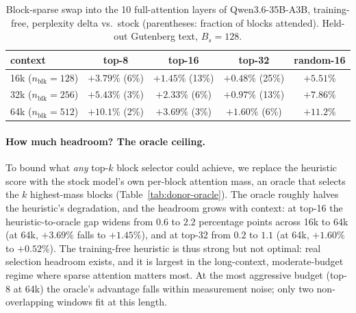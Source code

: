 \documentclass[10pt,letterpaper]{article}
\begin{document}
\begin{table}[h]
\centering
\caption{Block-sparse swap into the 10 full-attention layers of Qwen3.6-35B-A3B,
training-free, perplexity delta vs.\ stock (parentheses: fraction of blocks
attended). Held-out Gutenberg text, $B_s{=}128$.}
\label{tab:donor}
\small
\begin{tabular}{lcccc}
\toprule
context & top-8 & top-16 & top-32 & random-16 \\
\midrule
16k ($n_{\text{blk}}{=}128$) & $+3.79\%$ (6\%) & $+1.45\%$ (13\%) & $+0.48\%$ (25\%) & $+5.51\%$ \\
32k ($n_{\text{blk}}{=}256$) & $+5.43\%$ (3\%) & $+2.33\%$ (6\%) & $+0.97\%$ (13\%) & $+7.86\%$ \\
64k ($n_{\text{blk}}{=}512$) & $+10.1\%$ (2\%) & $+3.69\%$ (3\%) & $+1.60\%$ (6\%) & $+11.2\%$ \\
\bottomrule
\end{tabular}
\end{table}

\paragraph{How much headroom? The oracle ceiling.} To bound what \emph{any}
top-$k$ block selector could achieve, we replace the heuristic score with the
stock model's own per-block attention mass, an oracle that selects the $k$
highest-mass blocks (Table~\ref{tab:donor-oracle}). The oracle roughly halves the
heuristic's degradation, and the headroom grows with context: at top-16 the
heuristic-to-oracle gap widens from $0.6$ to $2.2$ percentage points across 16k to
64k (at 64k, $+3.69\%$ falls to $+1.45\%$), and at top-32 from $0.2$ to $1.1$ (at
64k, $+1.60\%$ to $+0.52\%$). The training-free heuristic is thus strong but not
optimal: real selection headroom exists, and it is largest in the long-context,
moderate-budget regime where sparse attention matters most. At the most aggressive
budget (top-8 at 64k) the oracle's advantage falls within measurement noise; only
two non-overlapping windows fit at this length.
\end{document}
